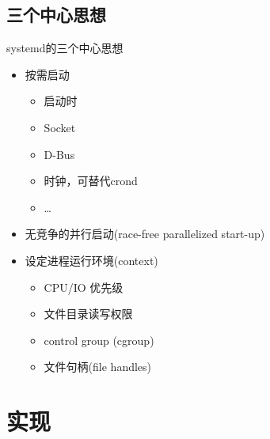 \documentclass[CJK,xetex]{beamer}
\begin{document}
\subsection{三个中心思想}
\begin{frame}{systemd的三个中心思想}
  \begin{itemize}[<+->]
  \item 按需启动
    \begin{itemize}
    \item 启动时
    \item Socket
    \item D-Bus
    \item 时钟，可替代crond
    \item \ldots
    \end{itemize}
  \item 无竞争的并行启动(race-free parallelized start-up)
  \item 设定进程运行环境(context)
    \begin{itemize}
    \item CPU/IO 优先级
    \item 文件目录读写权限
    \item control group (cgroup)
    \item 文件句柄(file handles)
    \end{itemize}
  \end{itemize}
\end{frame}

\section{实现}
\end{document}
